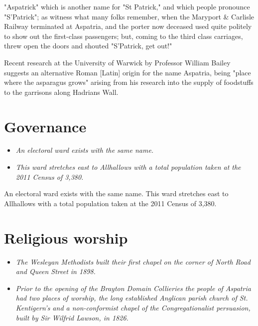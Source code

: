 "Aspatrick" which is another name for "St Patrick," and which people
pronounce "S'Patrick"; as witness what many folks remember, when the
Maryport \& Carlisle Railway terminated at Aspatria, and the porter now
deceased used quite politely to show out the first-class passengers;
but, coming to the third class carriages, threw open the doors and
shouted "S'Patrick, get out!"

Recent research at the University of Warwick by Professor William Bailey
suggests an alternative Roman {[}Latin{]} origin for the name Aspatria,
being "place where the asparagus grows" arising from his research into
the supply of foodstuffs to the garrisons along Hadrians Wall.

\section{Governance}\label{governance}

\begin{itemize}
\item
  \emph{An electoral ward exists with the same name.}
\item
  \emph{This ward stretches east to Allhallows with a total population
  taken at the 2011 Census of 3,380.}
\end{itemize}

An electoral ward exists with the same name. This ward stretches east to
Allhallows with a total population taken at the 2011 Census of 3,380.

\section{Religious worship}\label{religious-worship}

\begin{itemize}
\item
  \emph{The Wesleyan Methodists built their first chapel on the corner
  of North Road and Queen Street in 1898.}
\item
  \emph{Prior to the opening of the Brayton Domain Collieries the people
  of Aspatria had two places of worship, the long established Anglican
  parish church of St. Kentigern's and a non-conformist chapel of the
  Congregationalist persuasion, built by Sir Wilfrid Lawson, in 1826.}
\end{itemize}


